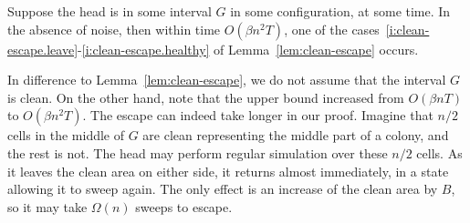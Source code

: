 \documentclass[12pt]{memoir}
\def\B{B}
\def\G{G}
\newcommand{\Tu}{T}
\begin{document}
\begin{lemma}[Escape]\label{lem:escape}
Suppose the head is in some interval \( \G \) in some configuration, at some time.
In the absence of noise,
then within time \( O(\beta n^{2}\Tu) \), one of the cases~\eqref{i:clean-escape.leave}-\eqref{i:clean-escape.healthy} 
of Lemma~\ref{lem:clean-escape} occurs.
  \end{lemma}
In difference to Lemma~\ref{lem:clean-escape}, we do not assume 
that the interval \( \G \) is clean.
On the other hand, note that the upper bound increased from \( O(\beta n\Tu) \) to \( O(\beta n^{2}\Tu) \).
The escape can indeed take longer in our proof.
Imagine that \( n/2 \) cells in the middle of \( G \) are clean representing the middle part of a colony, 
and the rest is not.
The head may perform regular simulation over these \( n/2 \) cells.
As it leaves the clean area on either side, it returns almost 
immediately, in a state allowing it to sweep again.
The only effect is an increase of the clean area by \( \B \), so it may take \( \Omega(n) \) sweeps to
escape.
\end{document}
